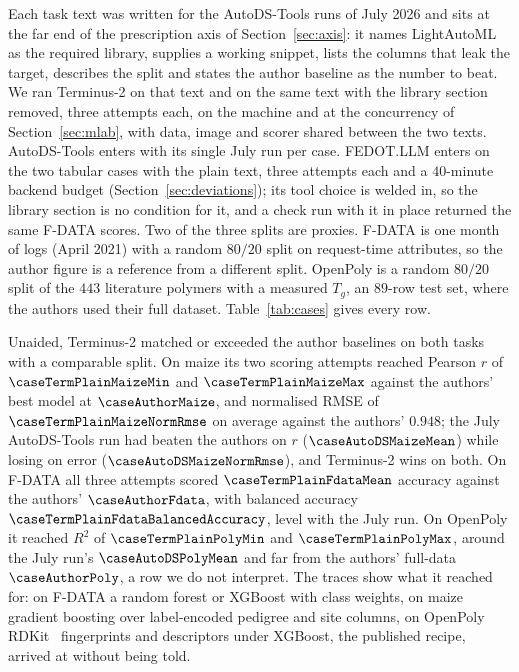 Each task text was written for the AutoDS-Tools runs of July 2026 and sits at the far
end of the prescription axis of Section~\ref{sec:axis}: it names LightAutoML~\citep{vakhrushev2021lightautoml}
as the required library, supplies a working snippet, lists the columns that
leak the target, describes the split and states the author baseline as the
number to beat. We ran Terminus-2 on that text and on the same text with the
library section removed, three attempts each, on the machine and at the
concurrency of Section~\ref{sec:mlab}, with data, image and scorer shared
between the two texts. AutoDS-Tools enters with its single July run per case.
FEDOT.LLM enters on the two tabular cases with the plain text, three attempts
each and a $40$-minute backend budget (Section~\ref{sec:deviations}); its tool
choice is welded in, so the library section is no condition for it, and a
check run with it in place returned the same F-DATA scores.
Two of the three splits are proxies. F-DATA is one month of logs (April 2021)
with a random $80/20$ split on request-time attributes, so the author figure is
a reference from a different split. OpenPoly is a random $80/20$ split of the
$443$ literature polymers with a measured $T_g$, an $89$-row test set, where
the authors used their full dataset. Table~\ref{tab:cases} gives every row.



Unaided, Terminus-2 matched or exceeded the author baselines on both tasks
with a comparable split. On maize its two scoring attempts reached Pearson
$r$ of $\caseTermPlainMaizeMin$ and $\caseTermPlainMaizeMax$ against the
authors' best model at $\caseAuthorMaize$, and normalised RMSE of
$\caseTermPlainMaizeNormRmse$ on average against the authors' $0.948$; the
July AutoDS-Tools run had beaten the authors on $r$
($\caseAutoDSMaizeMean$) while losing on error ($\caseAutoDSMaizeNormRmse$),
and Terminus-2 wins on both. On F-DATA all three attempts scored
$\caseTermPlainFdataMean$ accuracy against the authors' $\caseAuthorFdata$,
with balanced accuracy $\caseTermPlainFdataBalancedAccuracy$, level with the
July run. On OpenPoly it reached $R^2$ of $\caseTermPlainPolyMin$ and
$\caseTermPlainPolyMax$, around the July run's $\caseAutoDSPolyMean$ and far
from the authors' full-data $\caseAuthorPoly$, a row we do not interpret. The
traces show what it reached for: on F-DATA a random forest or XGBoost with
class weights, on maize gradient boosting over label-encoded pedigree and site
columns, on OpenPoly RDKit~\citep{rdkit} fingerprints and descriptors under
XGBoost, the published recipe, arrived at without being told.

